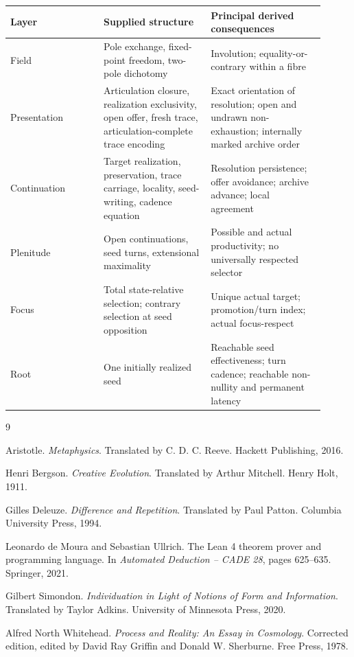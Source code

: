 \documentclass[11pt]{article}
\theoremstyle{definition}
\theoremstyle{remark}
\begin{document}
\begin{center}
\small
\begin{tabular}{@{}>{\raggedright\arraybackslash}p{0.27\linewidth}
  >{\raggedright\arraybackslash}p{0.31\linewidth}
  >{\raggedright\arraybackslash}p{0.33\linewidth}@{}}
\toprule
Layer & Supplied structure & Principal derived consequences \\
\midrule
Field
  & Pole exchange, fixed-point freedom, two-pole dichotomy
  & Involution; equality-or-contrary within a fibre \\
Presentation
  & Articulation closure, realization exclusivity, open offer, fresh trace,
    articulation-complete trace encoding
  & Exact orientation of resolution; open and undrawn non-exhaustion; internally
    marked archive order \\
Continuation
  & Target realization, preservation, trace carriage, locality, seed-writing,
    cadence equation
  & Resolution persistence; offer avoidance; archive advance; local agreement \\
Plenitude
  & Open continuations, seed turns, extensional maximality
  & Possible and actual productivity; no universally respected selector \\
Focus
  & Total state-relative selection; contrary selection at seed opposition
  & Unique actual target; promotion/turn index; actual focus-respect \\
Root
  & One initially realized seed
  & Reachable seed effectiveness; turn cadence; reachable non-nullity and
    permanent latency \\
\bottomrule
\end{tabular}
\end{center}

\begin{thebibliography}{9}

Aristotle.
\newblock \emph{Metaphysics}.
\newblock Translated by C. D. C. Reeve. Hackett Publishing, 2016.

Henri Bergson.
\newblock \emph{Creative Evolution}.
\newblock Translated by Arthur Mitchell. Henry Holt, 1911.

Gilles Deleuze.
\newblock \emph{Difference and Repetition}.
\newblock Translated by Paul Patton. Columbia University Press, 1994.

Leonardo de Moura and Sebastian Ullrich.
\newblock The Lean 4 theorem prover and programming language.
\newblock In \emph{Automated Deduction -- CADE 28}, pages 625--635.
Springer, 2021.

Gilbert Simondon.
\newblock \emph{Individuation in Light of Notions of Form and Information}.
\newblock Translated by Taylor Adkins. University of Minnesota Press, 2020.

Alfred North Whitehead.
\newblock \emph{Process and Reality: An Essay in Cosmology}.
\newblock Corrected edition, edited by David Ray Griffin and Donald W.
Sherburne. Free Press, 1978.

\end{thebibliography}
\end{document}
